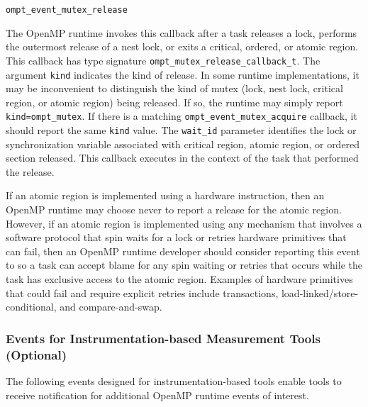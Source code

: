 \documentclass{article}
\newcommand{\descheader}[1]{{\needspace{3\baselineskip}\vspace{1em}\noindent \fbox{#1}}}
\begin{document}
\begin{description}

\item \verb|ompt_event_mutex_release| 

   The OpenMP runtime invokes this callback after a task releases a lock, performs the outermost release of a nest lock, or exits a critical, ordered, 
   or atomic region. 
   This callback has type signature \verb|ompt_mutex_release_callback_t|. 
   The argument \verb|kind| indicates the kind of release. In some runtime implementations, it may be inconvenient to distinguish the kind of mutex (lock, nest lock, 
   critical region, or atomic region) being released. If so, the runtime may simply report \verb|kind=|\verb|ompt_mutex|. If there is a matching 
   \verb|ompt_event_mutex_acquire| callback, it should report the same \verb|kind| value. 
   The \verb|wait_id| parameter identifies the lock or synchronization variable
   associated with critical region, atomic region, or ordered section released. This callback executes in the context of the task that performed the release. 
   
   If an atomic region is implemented using a hardware instruction, then an OpenMP runtime may choose never to report a release for the atomic region. 
   However, if an atomic region is implemented  using any mechanism that involves a software protocol that spin waits for a lock or retries hardware primitives
   that can fail, then an OpenMP 
   runtime developer should consider reporting this event to so a task can accept blame for any spin waiting or retries that occurs while the task has 
   exclusive access to the atomic region.
   Examples of hardware primitives that could fail and require explicit retries include transactions,  
   load-linked/store-conditional, and compare-and-swap.
   
\end{description}

\subsubsection{Events for Instrumentation-based Measurement Tools (Optional)}
\label{sec:trace-events}

The following events designed for instrumentation-based tools enable tools to receive notification for additional OpenMP runtime events of interest.

\descheader{Tasking}
\end{document}
